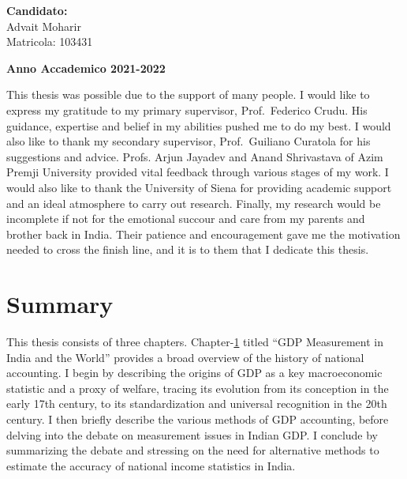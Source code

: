 \documentclass[12pt,nobind, a4paper]{reedthesis}
\begin{document}
	\hfill
	\begin{minipage}[t]{0.47\textwidth}\raggedleft
		{\large{\textbf{Candidato:}\\
				Advait Moharir\\
				Matricola: 103431}}
	\end{minipage}
	\vspace{2mm} %
	\begin{center}
		{\large{\bf Anno Accademico 2021-2022}}
	\end{center}
	\frontmatter %
	\pagestyle{empty} %
		\begin{acknowledgements}
		This thesis was possible due to the support of many people. I would like to express my gratitude to my primary supervisor, Prof.~Federico Crudu. His guidance, expertise and belief in my abilities pushed me to do my best. I would also like to thank my secondary supervisor, Prof.~Guiliano Curatola for his suggestions and advice. Profs. Arjun Jayadev and Anand Shrivastava of Azim Premji University provided vital feedback through various stages of my work. I would also like to thank the University of Siena for providing academic support and an ideal atmosphere to carry out research. Finally, my research would be incomplete if not for the emotional succour and care from my parents and brother back in India. Their patience and encouragement gave me the motivation needed to cross the finish line, and it is to them that I dedicate this thesis.
	\end{acknowledgements}
		
		\hypersetup{linkcolor=blue}
	\setcounter{secnumdepth}{2}
	\setcounter{tocdepth}{2}
	\tableofcontents
		
		\listoftables
		
		\listoffigures
		
		
		
	\mainmatter %
	\pagestyle{fancyplain} %
	
	\hypertarget{summary}{%
 \chapter*{Summary}\label{summary}}

 This thesis consists of three chapters. Chapter-\protect\hyperlink{ch1}{1} titled ``GDP Measurement in India and the World'' provides a broad overview of the history of national accounting. I begin by describing the origins of GDP as a key macroeconomic statistic and a proxy of welfare, tracing its evolution from its conception in the early 17th century, to its standardization and universal recognition in the 20th century. I then briefly describe the various methods of GDP accounting, before delving into the debate on measurement issues in Indian GDP. I conclude by summarizing the debate and stressing on the need for alternative methods to estimate the accuracy of national income statistics in India.
 \linebreak
\end{document}
